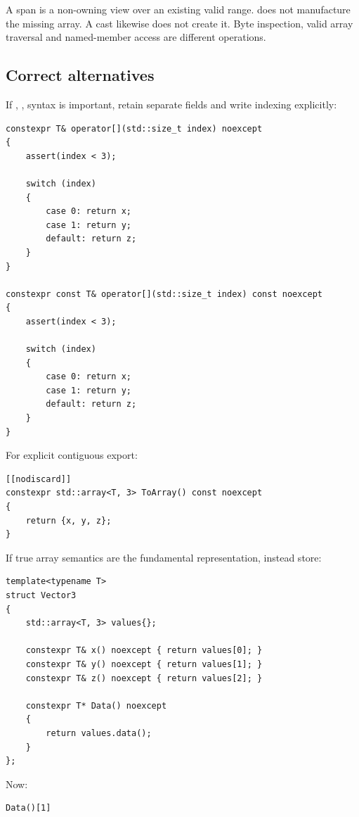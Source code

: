 A span is a non-owning view over an existing valid range.  does not manufacture the missing array. A cast likewise does not create it. Byte inspection, valid array traversal and named-member access are different operations.

\subsection{Correct alternatives}\label{05-engine-i-ch003-correct-alternatives}

\hypertarget{05-engine-i-ch003-correct-alternatives}{}

If , ,  syntax is important, retain separate fields and write indexing explicitly:

\begin{verbatim}
constexpr T& operator[](std::size_t index) noexcept
{
    assert(index < 3);

    switch (index)
    {
        case 0: return x;
        case 1: return y;
        default: return z;
    }
}

constexpr const T& operator[](std::size_t index) const noexcept
{
    assert(index < 3);

    switch (index)
    {
        case 0: return x;
        case 1: return y;
        default: return z;
    }
}
\end{verbatim}

For explicit contiguous export:

\begin{verbatim}
[[nodiscard]]
constexpr std::array<T, 3> ToArray() const noexcept
{
    return {x, y, z};
}
\end{verbatim}

If true array semantics are the fundamental representation, instead store:

\begin{verbatim}
template<typename T>
struct Vector3
{
    std::array<T, 3> values{};

    constexpr T& x() noexcept { return values[0]; }
    constexpr T& y() noexcept { return values[1]; }
    constexpr T& z() noexcept { return values[2]; }

    constexpr T* Data() noexcept
    {
        return values.data();
    }
};
\end{verbatim}

Now:

\begin{verbatim}
Data()[1]
\end{verbatim}

